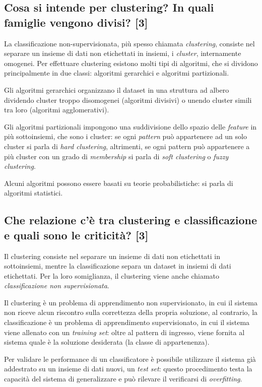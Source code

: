 \documentclass[\main/main.tex]{subfiles}
\begin{document}
\subsection{Cosa si intende per clustering? In quali famiglie vengono divisi? [3]}
La classificazione non-supervisionata, più spesso chiamata \textit{clustering}, consiste nel separare un insieme di dati non etichettati in insiemi, i \textit{cluster}, internamente omogenei.
Per effettuare clustering esistono molti tipi di algoritmi, che si dividono principalmente in due classi: algoritmi gerarchici e algoritmi partizionali.

Gli algoritmi gerarchici organizzano il dataset in una struttura ad albero dividendo cluster troppo disomogenei (algoritmi divisivi) o unendo cluster simili tra loro (algoritmi agglomerativi).

Gli algoritmi partizionali impongono una suddivisione dello spazio delle \textit{feature} in più sottoinsiemi, che sono i cluster: se ogni \textit{pattern} può appartenere ad un solo cluster si parla di \textit{hard clustering}, altrimenti, se ogni pattern può appartenere a più cluster con un grado di \textit{membership} si parla di \textit{soft clustering} o \textit{fuzzy clustering}.

Alcuni algoritmi possono essere basati su teorie probabilistiche: si parla di algoritmi statistici.

\subsection{Che relazione c'è tra clustering e classificazione e quali sono le criticità? [3]}
Il clustering consiste nel separare un insieme di dati non etichettati in sottoinsiemi, mentre la classificazione separa un dataset in insiemi di dati etichettati. Per la loro somiglianza, il clustering viene anche chiamato \textit{classificazione non supervisionata}.

Il clustering è un problema di apprendimento non supervisionato, in cui il sistema non riceve alcun riscontro sulla correttezza della propria soluzione, al contrario, la classificazione è un problema di apprendimento supervisionato, in cui il sistema viene allenato con un \textit{training set}: oltre al pattern di ingresso, viene fornita al sistema quale è la soluzione desiderata (la classe di appartenenza).

Per validare le performance di un classificatore è possibile utilizzare il sistema già addestrato su un insieme di dati nuovi, un \textit{test set}: questo procedimento testa la capacità del sistema di generalizzare e può rilevare il verificarsi di \textit{overfitting}.
\end{document}
